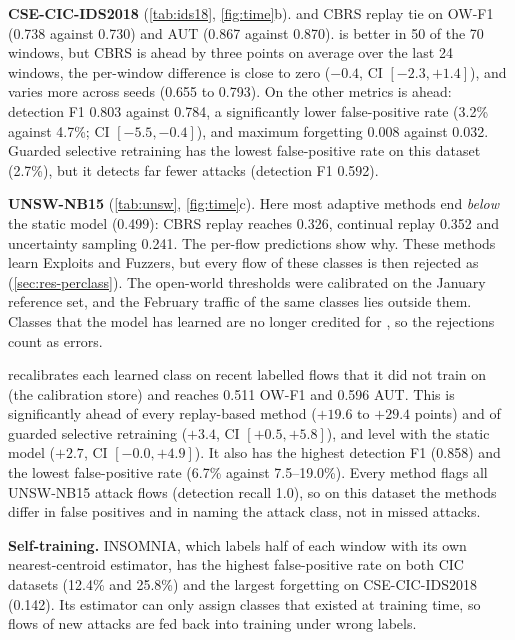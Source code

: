 \textbf{CSE-CIC-IDS2018} (\cref{tab:ids18}, \cref{fig:time}b). \nova{} and CBRS replay tie on OW-F1 (0.738 against
0.730) and AUT (0.867 against 0.870). \nova{} is better in 50 of the 70 windows, but CBRS is ahead by three points
on average over the last 24 windows, the per-window difference is close to zero ($-0.4$, CI $[-2.3, +1.4]$), and
\nova{} varies more across seeds (0.655 to 0.793). On the other metrics \nova{} is ahead: detection F1 0.803 against
0.784, a significantly lower false-positive rate (3.2\% against 4.7\%; CI $[-5.5, -0.4]$), and maximum forgetting
0.008 against 0.032. Guarded selective retraining has the lowest false-positive rate on this dataset (2.7\%), but
it detects far fewer attacks (detection F1 0.592).

\textbf{UNSW-NB15} (\cref{tab:unsw}, \cref{fig:time}c). Here most adaptive methods end \emph{below} the static
model (0.499): CBRS replay reaches 0.326, continual replay 0.352 and uncertainty sampling 0.241. The per-flow
predictions show why. These methods learn Exploits and Fuzzers, but every flow of these classes is then rejected
as \unk{} (\cref{sec:res-perclass}). The open-world thresholds were calibrated on the January reference set, and
the February traffic of the same classes lies outside them. Classes that the model has learned are no longer
credited for \unk{}, so the rejections count as errors.

\nova{} recalibrates each learned class on recent labelled flows that it did not train on (the calibration store)
and reaches 0.511 OW-F1 and 0.596 AUT. This is significantly ahead of every replay-based method ($+19.6$ to
$+29.4$ points) and of guarded selective retraining ($+3.4$, CI $[+0.5, +5.8]$), and level with the static model
($+2.7$, CI $[-0.0, +4.9]$). It also has the highest detection F1 (0.858) and the lowest false-positive rate
(6.7\% against 7.5--19.0\%). Every method flags all UNSW-NB15 attack flows (detection recall 1.0), so on this
dataset the methods differ in false positives and in naming the attack class, not in missed attacks.

\textbf{Self-training.} INSOMNIA, which labels half of each window with its own nearest-centroid estimator, has
the highest false-positive rate on both CIC datasets (12.4\% and 25.8\%) and the largest forgetting on
CSE-CIC-IDS2018 (0.142). Its estimator can only assign classes that existed at training time, so flows of new
attacks are fed back into training under wrong labels.

